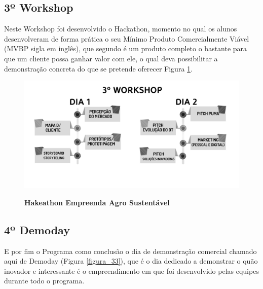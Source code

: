 \subsection{3º Workshop}
 
Neste Workshop foi desenvolvido o Hackathon, momento no qual os alunos desenvolveram de forma prática o seu Mínimo Produto Comercialmente Viável (MVBP sigla em inglês), que segundo  é um produto completo o bastante para que um cliente possa ganhar valor com ele, o qual deva possibilitar a demonstração concreta do que se pretende oferecer Figura \ref{figura_32}. 


\begin{figure}[H]
\centering
\caption{\textbf{Hakeathon Empreenda Agro Sustentável}}
\includegraphics[scale=0.4]{Imagens/workshop-03.png}
\label{figura_32}
\end{figure}

\subsection{4º Demoday}

E por fim o Programa como conclusão o dia de demonstração comercial chamado aqui de Demoday (Figura \ref{figura_33}), que é o dia dedicado a demonstrar o quão inovador e interessante é o empreendimento em que foi desenvolvido pelas equipes durante todo o programa.


